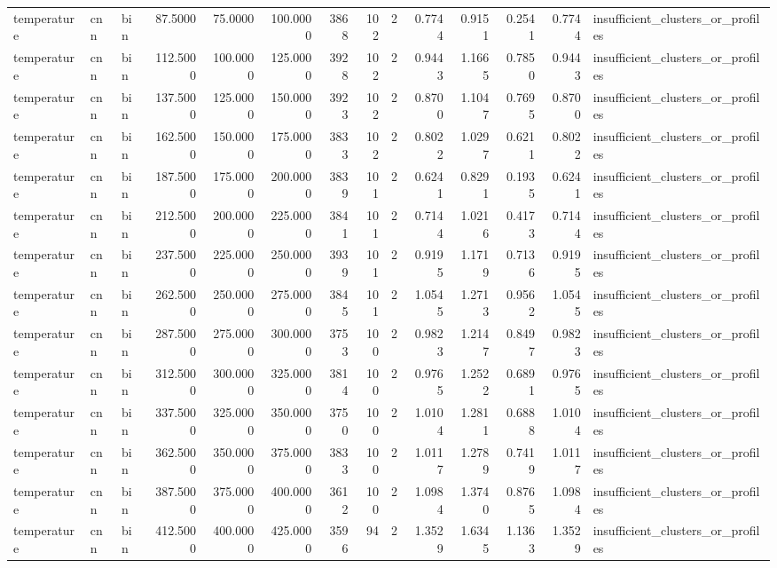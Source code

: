 \begin{tabular}{lllrrrrrrrrrrl}
temperature & cnn & bin & 87.5000 & 75.0000 & 100.0000 & 3868 & 102 & 2 & 0.7744 & 0.9151 & 0.2541 & 0.7744 & insufficient_clusters_or_profiles \\
temperature & cnn & bin & 112.5000 & 100.0000 & 125.0000 & 3928 & 102 & 2 & 0.9443 & 1.1665 & 0.7850 & 0.9443 & insufficient_clusters_or_profiles \\
temperature & cnn & bin & 137.5000 & 125.0000 & 150.0000 & 3923 & 102 & 2 & 0.8700 & 1.1047 & 0.7695 & 0.8700 & insufficient_clusters_or_profiles \\
temperature & cnn & bin & 162.5000 & 150.0000 & 175.0000 & 3833 & 102 & 2 & 0.8022 & 1.0297 & 0.6211 & 0.8022 & insufficient_clusters_or_profiles \\
temperature & cnn & bin & 187.5000 & 175.0000 & 200.0000 & 3839 & 101 & 2 & 0.6241 & 0.8291 & 0.1935 & 0.6241 & insufficient_clusters_or_profiles \\
temperature & cnn & bin & 212.5000 & 200.0000 & 225.0000 & 3841 & 101 & 2 & 0.7144 & 1.0216 & 0.4173 & 0.7144 & insufficient_clusters_or_profiles \\
temperature & cnn & bin & 237.5000 & 225.0000 & 250.0000 & 3939 & 101 & 2 & 0.9195 & 1.1719 & 0.7136 & 0.9195 & insufficient_clusters_or_profiles \\
temperature & cnn & bin & 262.5000 & 250.0000 & 275.0000 & 3845 & 101 & 2 & 1.0545 & 1.2713 & 0.9562 & 1.0545 & insufficient_clusters_or_profiles \\
temperature & cnn & bin & 287.5000 & 275.0000 & 300.0000 & 3753 & 100 & 2 & 0.9823 & 1.2147 & 0.8497 & 0.9823 & insufficient_clusters_or_profiles \\
temperature & cnn & bin & 312.5000 & 300.0000 & 325.0000 & 3814 & 100 & 2 & 0.9765 & 1.2522 & 0.6891 & 0.9765 & insufficient_clusters_or_profiles \\
temperature & cnn & bin & 337.5000 & 325.0000 & 350.0000 & 3750 & 100 & 2 & 1.0104 & 1.2811 & 0.6888 & 1.0104 & insufficient_clusters_or_profiles \\
temperature & cnn & bin & 362.5000 & 350.0000 & 375.0000 & 3833 & 100 & 2 & 1.0117 & 1.2789 & 0.7419 & 1.0117 & insufficient_clusters_or_profiles \\
temperature & cnn & bin & 387.5000 & 375.0000 & 400.0000 & 3612 & 100 & 2 & 1.0984 & 1.3740 & 0.8765 & 1.0984 & insufficient_clusters_or_profiles \\
temperature & cnn & bin & 412.5000 & 400.0000 & 425.0000 & 3596 & 94 & 2 & 1.3529 & 1.6345 & 1.1363 & 1.3529 & insufficient_clusters_or_profiles \\

\end{tabular}
